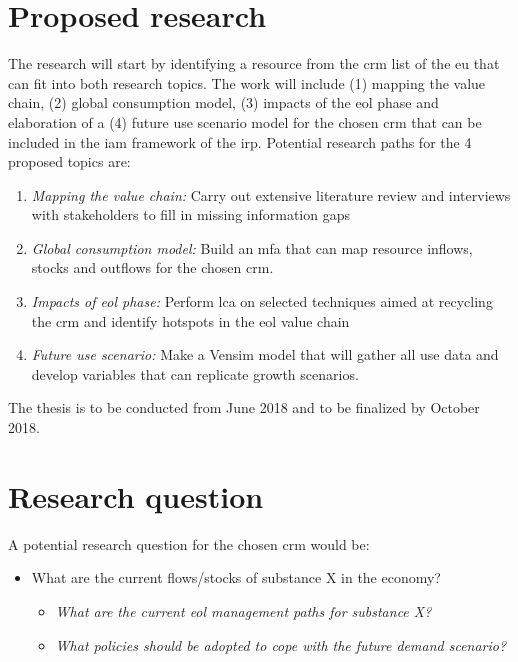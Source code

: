 \documentclass{article}
\begin{document}
\section*{Proposed research}
The research will start by identifying a resource from the \acrshort{crm} list of the \acrshort{eu} that can fit into both research topics. The work will include (1) mapping the value chain, (2) global consumption model, (3) impacts of the \acrfull{eol} phase and elaboration of a (4) future use scenario model for the chosen \acrshort{crm} that can be included in the \acrshort{iam} framework of the
\acrshort{irp}. Potential research paths for the 4 proposed topics are:
\begin{enumerate}
    \item \textit{Mapping the value chain:} Carry out extensive literature review and interviews with stakeholders to fill in missing information gaps
    \item \textit{Global consumption model:} Build an \acrfull{mfa} that can map resource inflows, stocks and outflows for the chosen \acrshort{crm}.
    \item \textit{Impacts of \acrshort{eol} phase:} Perform \acrshort{lca} on selected techniques aimed at recycling the \acrshort{crm} and identify hotspots in the \acrshort{eol} value chain
    \item \textit{Future use scenario:} Make a Vensim model that will gather all use data and develop variables that can replicate growth scenarios.
\end{enumerate}

The thesis is to be conducted from June 2018 and to be finalized by October 2018.

\section*{Research question}
A potential research question for the chosen \acrshort{crm} would be:
\begin{itemize}
\item What are the current flows/stocks of substance X in the economy?
    \begin{itemize}
    \item \textit{What are the current \acrshort{eol} management paths for substance X?}
    \item \textit{What policies should be adopted to cope with the future demand scenario?}
    \end{itemize}

\end{itemize}
\vspace{1.5cm}
\printglossary
{}
\printbibliography
\end{document}
